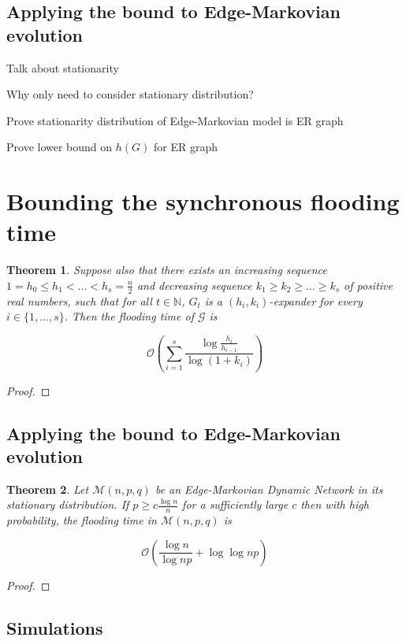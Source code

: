 \documentclass[a4paper,11pt]{article}
\newtheorem{theorem}{Theorem}[section]
\theoremstyle{definition}
\begin{document}
\subsection{Applying the bound to Edge-Markovian evolution}

Talk about stationarity

Why only need to consider stationary distribution?

Prove stationarity distribution of Edge-Markovian model is ER graph

Prove lower bound on $h(G)$ for ER graph

\section{Bounding the synchronous flooding time}

\begin{theorem}
	\ModelIntro Suppose also that there exists an increasing sequence $1 = h_0 \leq h_1 < \dots < h_s = \frac{n}{2}$ and decreasing sequence $k_1 \geq k_2 \geq \dots \geq k_s$ of positive real numbers, such that for all $t \in \mathbb{N}$, $G_t$ is a $(h_i, k_i)$-expander for every $i \in \{1, \dots , s\}$. Then the flooding time of $\mathcal{G}$ is

	$$
		\mathcal{O}\left(\sum_{i=1}^s \frac{\log \frac{h_i}{h_{i-1}}}{\log(1+k_i)}\right)
	$$
\end{theorem}

\begin{proof}
	
\end{proof}

\subsection{Applying the bound to Edge-Markovian evolution}

\begin{theorem}
	Let $\mathcal{M}(n, p, q)$ be an Edge-Markovian Dynamic Network in its stationary distribution. If $p \geq c \frac{\log n}{n}$ for a sufficiently large $c$ then with high probability, the flooding time in $\mathcal{M}(n, p, q)$ is 

	$$
		\mathcal{O}\left(\frac{\log n}{\log np} + \log \log np \right)
	$$
\end{theorem}

\begin{proof}
	
\end{proof}


\subsection{Simulations}
\end{document}
